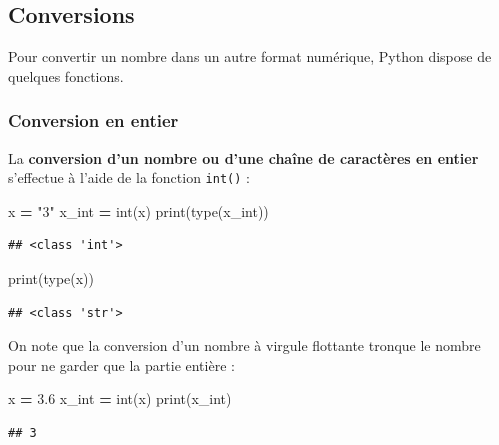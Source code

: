 \documentclass[12pt,]{book}
\newenvironment{Shaded}{\begin{snugshade}}{\end{snugshade}}
\newcommand{\FloatTok}[1]{\textcolor[rgb]{0.00,0.00,0.81}{#1}}
\newcommand{\StringTok}[1]{\textcolor[rgb]{0.31,0.60,0.02}{#1}}
\newcommand{\OperatorTok}[1]{\textcolor[rgb]{0.81,0.36,0.00}{\textbf{#1}}}
\newcommand{\BuiltInTok}[1]{#1}
\newcommand{\NormalTok}[1]{#1}
\numberwithin{equation}{section}
\numberwithin{countremarque}{section}
\begin{document}
\subsection{Conversions}\label{conversions}

Pour convertir un nombre dans un autre format numérique, Python dispose
de quelques fonctions.

\subsubsection{Conversion en entier}\label{conversion-en-entier}

La \textbf{conversion d'un nombre ou d'une chaîne de caractères en
entier} s'effectue à l'aide de la fonction \texttt{int()} :

\begin{Shaded}
\begin{Highlighting}[]
\NormalTok{x }\OperatorTok{=} \StringTok{"3"}
\NormalTok{x_int }\OperatorTok{=} \BuiltInTok{int}\NormalTok{(x)}
\BuiltInTok{print}\NormalTok{(}\BuiltInTok{type}\NormalTok{(x_int))}
\end{Highlighting}
\end{Shaded}

\begin{lstlisting}
## <class 'int'>
\end{lstlisting}

\begin{Shaded}
\begin{Highlighting}[]
\BuiltInTok{print}\NormalTok{(}\BuiltInTok{type}\NormalTok{(x))}
\end{Highlighting}
\end{Shaded}

\begin{lstlisting}
## <class 'str'>
\end{lstlisting}

On note que la conversion d'un nombre à virgule flottante tronque le
nombre pour ne garder que la partie entière :

\begin{Shaded}
\begin{Highlighting}[]
\NormalTok{x }\OperatorTok{=} \FloatTok{3.6}
\NormalTok{x_int }\OperatorTok{=} \BuiltInTok{int}\NormalTok{(x)}
\BuiltInTok{print}\NormalTok{(x_int)}
\end{Highlighting}
\end{Shaded}

\begin{lstlisting}
## 3
\end{lstlisting}
\end{document}
